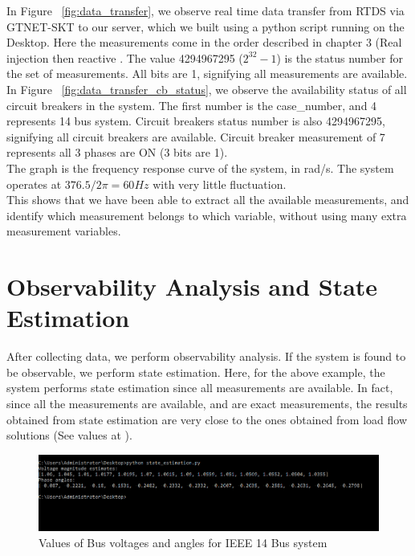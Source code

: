 In Figure ~\ref{fig:data_transfer}, we observe real time data transfer from RTDS via GTNET-SKT to our server, which we built using a python script running on the Desktop. Here the measurements come in the order described in chapter 3 (Real injection then reactive . The value 4294967295 ($2^{32}-1$) is the status number for the set of measurements. All bits are 1, signifying all measurements are available. In Figure ~\ref{fig:data_transfer_cb_status}, we observe the availability status of all circuit breakers in the system. The first number is the case\_number, and 4 represents 14 bus system. Circuit breakers status number is also 4294967295, signifying all circuit breakers are available. Circuit breaker measurement of 7 represents all 3 phases are ON (3 bits are 1).\\
The graph is the frequency response curve of the system, in rad/s. The system operates at $376.5/2 \pi=60Hz$ with very little fluctuation.\\

This shows that we have been able to extract all the available measurements, and identify which measurement belongs to which variable, without using many extra measurement variables.

\section{Observability Analysis and State Estimation}
After collecting data, we perform observability analysis. If the system is found to be observable, we perform state estimation.
Here, for the above example, the system performs state estimation since all measurements are available. In fact, since all the measurements are available, and are exact measurements, the results obtained from state estimation are very close to the ones obtained from load flow solutions (See values at \cite{uwash_cdf}).

\begin{figure}
\includegraphics[width=\textwidth]{Figures/state_estimate.png}
\caption{Values of Bus voltages and angles for IEEE 14 Bus system}
\label{fig:se}
\end{figure}

